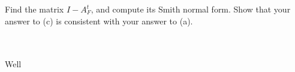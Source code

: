 Find the matrix $I-A_F^t$, and compute its Smith normal form. Show that your answer to (c) is
consistent with your answer to (a).\\\\

\begin{solution}\renewcommand{\qedsymbol}{}\ \\
    Well
\end{solution}